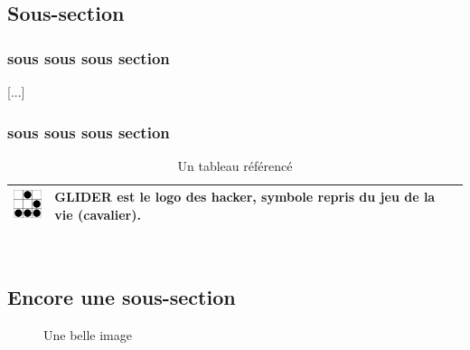 \documentclass[11pt,twoside,a4paper]{article}
\begin{document}
\subsection{Sous-section}



\subsubsection{sous sous sous section}

[...]~\\

\subsubsection{sous sous sous section}


\begin{table}[ht]

	\begin{center}

		\begin{tabular}{|p{}|p{}|}

		\hline

			\includegraphics[width=1cm]{img/logo_glider.png}
			& 
			\textbf{GLIDER} est le logo des hacker, symbole repris du jeu de la vie (cavalier). \\

		\hline

		\end{tabular}

	\end{center}

	\caption{Un tableau r{\'e}f{\'e}renc{\'e}}

	\label{tab:TabReference01}

\end{table}~\\



\clearpage

\subsection{Encore une sous-section}


\begin{figure}[H]
	\centerline {}
	\caption{Une belle image}
	\label{fig:FigReference01}
\end{figure}
\end{document}
